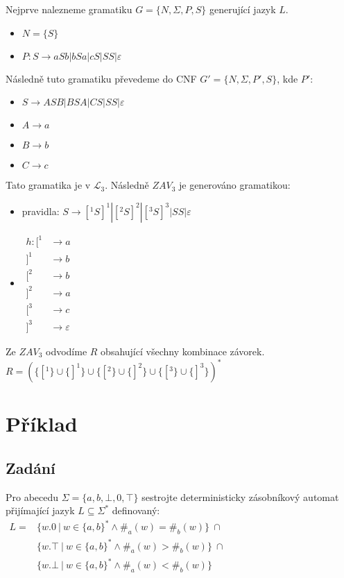 \documentclass[11pt, a4paper]{article}
\begin{document}
Nejprve nalezneme gramatiku $G = \{N, \Sigma, P, S\}$ generující jazyk $L$.
\begin{itemize}[label={},noitemsep]
	\item $N = \{S\}$
	\item $P: S \rightarrow aSb | bSa | cS | SS | \varepsilon$
\end{itemize}

\noindent Následně tuto gramatiku převedeme do CNF $G'= \{N, \Sigma, P', S\}$, kde $P'$:
\begin{itemize}[label={},noitemsep]
	\item $S \rightarrow ASB | BSA | CS | SS | \varepsilon$
	\item $A \rightarrow a$
	\item $B \rightarrow b$
	\item $C \rightarrow c$
\end{itemize}

\noindent Tato gramatika je v $\mathcal{L}_3$. Následně $ZAV_3$ je generováno gramatikou:
\begin{itemize}[label={},noitemsep]
	\item pravidla: $S \rightarrow [^1S]^1 | [^2S]^2 | [^3S]^3 | SS | \varepsilon$
	\item $\begin{aligned}h: [^1 &\rightarrow a \\
	      ]^1 &\rightarrow b \\
	      [^2 &\rightarrow b \\
	      ]^2 &\rightarrow a \\
	      [^3 &\rightarrow c \\
	      ]^3 &\rightarrow \varepsilon
	\end{aligned}$
\end{itemize}

\noindent Ze $ZAV_3$ odvodíme $R$ obsahující všechny kombinace závorek. $R = (\{[^1\} \cup \{]^1\} \cup \{[^2\} \cup \{]^2\} \cup \{[^3\} \cup \{]^3\})^*$

\clearpage
\maketitle
\section{Příklad}
\subsection*{Zadání}
Pro abecedu $ \Sigma = \{a, b, \bot, 0, \top \} $ sestrojte deterministicky zásobníkový automat přijímající jazyk $ L \subseteq \Sigma^* $ definovaný:
$\begin{aligned}
	L = & \{w.0\ |\ w \in \{a, b \}^* \wedge \#_a(w) = \#_b(w)\}\ \cap    \\
	    & \{w.\top\ |\ w \in \{a, b \}^* \wedge \#_a(w) > \#_b(w)\}\ \cap \\
	    & \{w.\bot\ |\ w \in \{a, b \}^* \wedge \#_a(w) < \#_b(w)\}
\end{aligned}$
\end{document}
